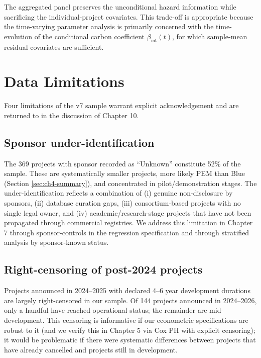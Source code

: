 The aggregated panel preserves the unconditional hazard information while sacrificing the individual-project covariates. This trade-off is appropriate because the time-varying parameter analysis is primarily concerned with the time-evolution of the conditional carbon coefficient $\beta_{\mathrm{int}}(t)$, for which sample-mean residual covariates are sufficient.

\section{Data Limitations}
\label{sec:ch4-limitations}

Four limitations of the v7 sample warrant explicit acknowledgement and are returned to in the discussion of Chapter 10.

\subsection{Sponsor under-identification}

The 369 projects with sponsor recorded as ``Unknown'' constitute 52\% of the sample. These are systematically smaller projects, more likely PEM than Blue (Section \ref{sec:ch4-summary}), and concentrated in pilot/demonstration stages. The under-identification reflects a combination of (i) genuine non-disclosure by sponsors, (ii) database curation gaps, (iii) consortium-based projects with no single legal owner, and (iv) academic/research-stage projects that have not been propagated through commercial registries. We address this limitation in Chapter 7 through sponsor-controls in the regression specification and through stratified analysis by sponsor-known status.

\subsection{Right-censoring of post-2024 projects}

Projects announced in 2024--2025 with declared 4--6 year development durations are largely right-censored in our sample. Of 144 projects announced in 2024--2026, only a handful have reached operational status; the remainder are mid-development. This censoring is informative if our econometric specifications are robust to it (and we verify this in Chapter 5 via Cox PH with explicit censoring); it would be problematic if there were systematic differences between projects that have already cancelled and projects still in development.

